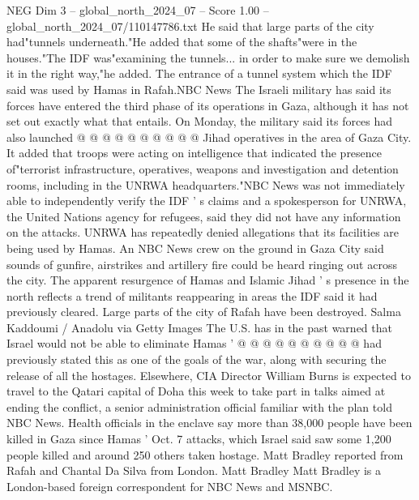 \begin{textsample}{NEG Dim 3 – global\_north\_2024\_07 – Score 1.00 – global\_north\_2024\_07/110147786.txt}
He said that large parts of the city had"tunnels underneath."He added that some of the shafts"were in the houses."The IDF was"examining the tunnels... in order to make sure we demolish it in the right way,"he added.
The entrance of a tunnel system which the IDF said was used by Hamas in Rafah.NBC News The Israeli military has said its forces have entered the third phase of its operations in Gaza, although it has not set out exactly what that entails.
On Monday, the military said its forces had also launched @ @ @ @ @ @ @ @ @ @ Jihad operatives in the area of Gaza City.
It added that troops were acting on intelligence that indicated the presence of"terrorist infrastructure, operatives, weapons and investigation and detention rooms, including in the UNRWA headquarters."NBC News was not immediately able to independently verify the IDF ' s claims and a spokesperson for UNRWA, the United Nations agency for refugees, said they did not have any information on the attacks.
UNRWA has repeatedly denied allegations that its facilities are being used by Hamas.
An NBC News crew on the ground in Gaza City said sounds of gunfire, airstrikes and artillery fire could be heard ringing out across the city.
The apparent resurgence of Hamas and Islamic Jihad ' s presence in the north reflects a trend of militants reappearing in areas the IDF said it had previously cleared.
Large parts of the city of Rafah have been destroyed.
Salma Kaddoumi / Anadolu via Getty Images The U.S. has in the past warned that Israel would not be able to eliminate Hamas ' @ @ @ @ @ @ @ @ @ @ had previously stated this as one of the goals of the war, along with securing the release of all the hostages.
Elsewhere, CIA Director William Burns is expected to travel to the Qatari capital of Doha this week to take part in talks aimed at ending the conflict, a senior administration official familiar with the plan told NBC News.
Health officials in the enclave say more than 38,000 people have been killed in Gaza since Hamas ' Oct. 7 attacks, which Israel said saw some 1,200 people killed and around 250 others taken hostage.
Matt Bradley reported from Rafah and Chantal Da Silva from London.
Matt Bradley Matt Bradley is a London-based foreign correspondent for NBC News and MSNBC.

\end{textsample}
